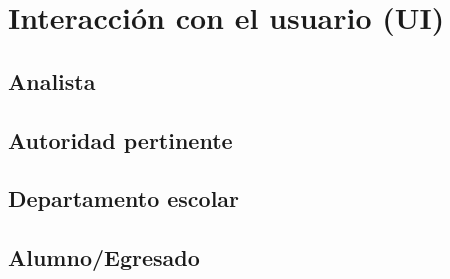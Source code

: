\documentclass[oneside,10pt]{book}
\begin{document}
\chapter{Interacción con el usuario (UI)}
\section{Analista}
\section{Autoridad pertinente}
\section{Departamento escolar}
\section{ Alumno/Egresado}
\end{document}
